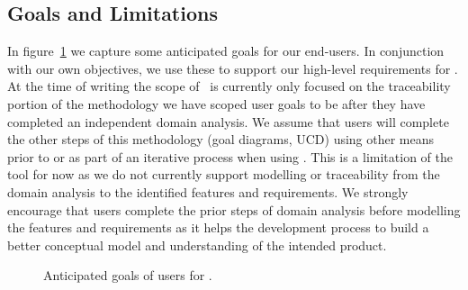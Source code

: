 \subsection{Goals and Limitations}

In figure~\ref{fig:CyclicL_goals} we capture some anticipated goals for our end-users. In conjunction with our own objectives, we use these to support our high-level requirements for \tool. At the time of writing the scope of \tool\ is currently only focused on the traceability portion of the methodology we have scoped user goals to be after they have completed an independent domain analysis. We assume that users will complete the other steps of this methodology (goal diagrams, \ac{UCD}) using other means prior to or as part of an iterative process when using \tool. This is a limitation of the tool for now as we do not currently support modelling or traceability from the domain analysis to the identified features and requirements. We strongly encourage that users complete the prior steps of domain analysis before modelling the features and requirements as it helps the development process to build a better conceptual model and understanding of the intended product.



\begin{figure}
	\centering
	
	\caption{Anticipated goals of users for \tool.}
	\label{fig:CyclicL_goals}
\end{figure}

